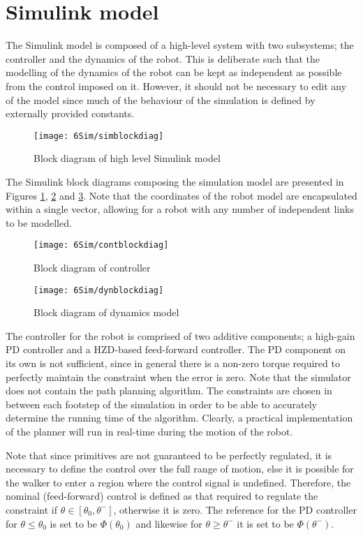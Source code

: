 \section{Simulink model}
The Simulink model is composed of a high-level system with two subsystems; the controller and the dynamics of the robot. This is deliberate such that the modelling of the dynamics of the robot can be kept as independent as possible from the control imposed on it. However, it should not be necessary to edit any of the model since much of the behaviour of the simulation is defined by externally provided constants.

\begin{figure}
	\centering
	\texttt{[image: 6Sim/simblockdiag]}
	\caption{Block diagram of high level Simulink model}
	\label{fig:simblockdiag}
\end{figure}

The Simulink block diagrams composing the simulation model are presented in Figures \ref{fig:simblockdiag}, \ref{fig:contblockdiag} and \ref{fig:dynblockdiag}. Note that the coordinates of the robot model are encapsulated within a single vector, allowing for a robot with any number of independent links to be modelled.

\begin{figure}
	\centering
	\texttt{[image: 6Sim/contblockdiag]}
	\caption{Block diagram of controller}
	\label{fig:contblockdiag}
\end{figure}

\begin{figure}
	\centering
	\texttt{[image: 6Sim/dynblockdiag]}
	\caption{Block diagram of dynamics model}
	\label{fig:dynblockdiag}
\end{figure}

The controller for the robot is comprised of two additive components; a high-gain PD controller and a HZD-based feed-forward controller. The PD component on its own is not sufficient, since in general there is a non-zero torque required to perfectly maintain the constraint when the error is zero. Note that the simulator does not contain the path planning algorithm. The constraints are chosen in between each footstep of the simulation in order to be able to accurately determine the running time of the algorithm. Clearly, a practical implementation of the planner will run in real-time during the motion of the robot.

Note that since primitives are not guaranteed to be perfectly regulated, it is necessary to define the control over the full range of motion, else it is possible for the walker to enter a region where the control signal is undefined. Therefore, the nominal (feed-forward) control is defined as that required to regulate the constraint if $\theta \in [\theta_0, \theta^-]$, otherwise it is zero. The reference for the PD controller for $\theta \leq \theta_0$ is set to be $\Phi(\theta_0)$ and likewise for $\theta \geq \theta^-$ it is set to be $\Phi(\theta^-)$.

